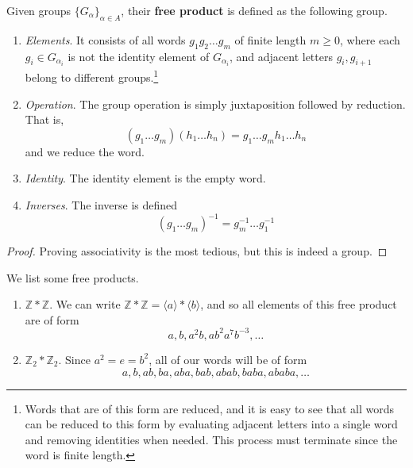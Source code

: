 	\begin{definition}
	  \label{def:free-product-of-groups}
		Given groups $\{G_\alpha\}_{\alpha \in A}$, their \textbf{free product} is defined as the following group. 
		\begin{enumerate}
			\item \textit{Elements}. It consists of all words $g_1 g_2 \ldots g_m$ of finite length $m \geq 0$, where each $g_i \in G_{\alpha_i}$ is not the identity element of $G_{\alpha_i}$, and adjacent letters $g_i, g_{i+1}$ belong to different groups.\footnote{Words that are of this form are reduced, and it is easy to see that all words can be reduced to this form by evaluating adjacent letters into a single word and removing identities when needed. This process must terminate since the word is finite length.}  

			\item \textit{Operation}. The group operation is simply juxtaposition followed by reduction. That is, 
				\begin{equation}
					(g_1 \ldots g_m)(h_1 \ldots h_n) = g_1 \ldots g_m h_1 \ldots h_n
				\end{equation}
				and we reduce the word. 

			\item \textit{Identity}. The identity element is the empty word. 

			\item \textit{Inverses}. The inverse is defined 
				\begin{equation}
					(g_1 \ldots g_m)^{-1} = g_m^{-1} \ldots g_1^{-1}
				\end{equation}
		\end{enumerate}
	\end{definition}
	\begin{proof}
	  Proving associativity is the most tedious, but this is indeed a group. 
	\end{proof}

	\begin{example}
	  \label{ex:free-products-of-simple-groups}
	  We list some free products. 
		\begin{enumerate}
			\item $\mathbb{Z} \ast \mathbb{Z}$. We can write $\mathbb{Z} \ast \mathbb{Z} = \langle a \rangle \ast \langle b \rangle$, and so all elements of this free product are of form 
				\begin{equation}
					a, b, a^2 b, ab^2 a^7 b^{-3}, \ldots
				\end{equation}

			\item $\mathbb{Z}_2 \ast \mathbb{Z}_2$. Since $a^2 = e = b^2$, all of our words will be of form 
				\begin{equation}
				  a, b, ab, ba, aba, bab, abab, baba, ababa, \ldots
				\end{equation}
		\end{enumerate}
	\end{example}


